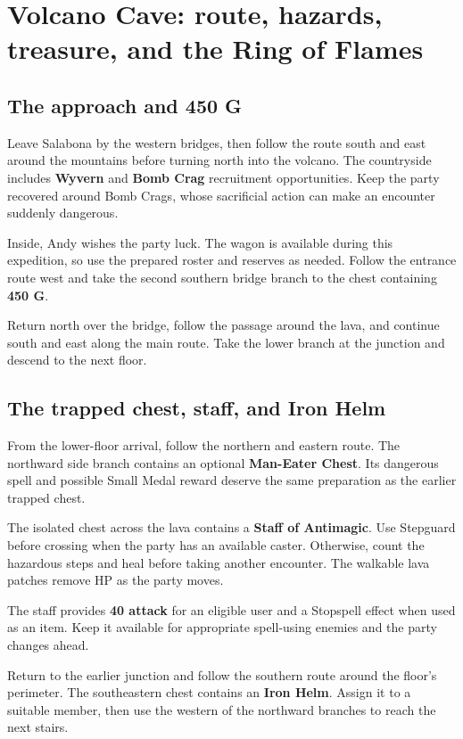 \section{Volcano Cave: route, hazards, treasure, and the Ring of Flames}

\subsection*{The approach and 450 G}

Leave Salabona by the western bridges, then follow the route south
and east around the mountains before turning north into the volcano.
The countryside includes \textbf{Wyvern} and \textbf{Bomb Crag}
recruitment opportunities. Keep the party recovered around Bomb Crags,
whose sacrificial action can make an encounter suddenly dangerous.

Inside, Andy wishes the party luck. The wagon is available during
this expedition, so use the prepared roster and reserves as needed.
Follow the entrance route west and take the second southern bridge
branch to the chest containing \textbf{450 G}.

Return north over the bridge, follow the passage around the lava,
and continue south and east along the main route. Take the lower
branch at the junction and descend to the next floor.

\subsection*{The trapped chest, staff, and Iron Helm}

From the lower-floor arrival, follow the northern and eastern route.
The northward side branch contains an optional
\textbf{Man-Eater Chest}. Its dangerous spell and possible Small Medal
reward deserve the same preparation as the earlier trapped chest.

The isolated chest across the lava contains a
\textbf{Staff of Antimagic}. Use Stepguard before crossing when the
party has an available caster. Otherwise, count the hazardous steps
and heal before taking another encounter. The walkable lava patches
remove HP as the party moves.

The staff provides \textbf{40 attack} for an eligible user and a
Stopspell effect when used as an item. Keep it available for appropriate
spell-using enemies and the party changes ahead.

Return to the earlier junction and follow the southern route around
the floor's perimeter. The southeastern chest contains an
\textbf{Iron Helm}. Assign it to a suitable member, then use the
western of the northward branches to reach the next stairs.

